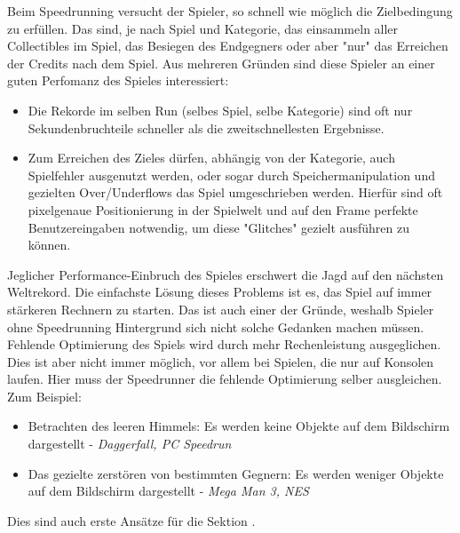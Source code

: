 Beim Speedrunning versucht der Spieler, so schnell wie möglich die Zielbedingung zu erfüllen. Das sind, je nach Spiel und Kategorie, das einsammeln aller Collectibles im Spiel, das Besiegen des Endgegners oder aber "nur" das Erreichen der Credits nach dem Spiel. Aus mehreren Gründen sind diese Spieler an einer guten Perfomanz des Spieles interessiert:

\begin{itemize}
\item Die Rekorde im selben Run (selbes Spiel, selbe Kategorie) sind oft nur Sekundenbruchteile schneller als die zweitschnellesten Ergebnisse.
\item Zum Erreichen des Zieles dürfen, abhängig von der Kategorie, auch Spielfehler ausgenutzt werden, oder sogar durch Speichermanipulation und gezielten Over/Underflows das Spiel umgeschrieben werden. Hierfür sind oft pixelgenaue Positionierung in der Spielwelt und auf den Frame perfekte Benutzereingaben notwendig, um diese "Glitches" gezielt ausführen zu können.
\end{itemize}

Jeglicher Performance-Einbruch des Spieles erschwert die Jagd auf den nächsten Weltrekord. Die einfachste Lösung dieses Problems ist es, das Spiel auf immer stärkeren Rechnern zu starten. Das ist auch einer der Gründe, weshalb Spieler ohne Speedrunning Hintergrund sich nicht solche Gedanken machen müssen. Fehlende Optimierung des Spiels wird durch mehr Rechenleistung ausgeglichen.
Dies ist aber nicht immer möglich, vor allem bei Spielen, die nur auf Konsolen laufen. Hier muss der Speedrunner die fehlende Optimierung selber ausgleichen. Zum Beispiel:
\begin{itemize}
\item Betrachten des leeren Himmels: Es werden keine Objekte auf dem Bildschirm dargestellt - \emph{Daggerfall, PC Speedrun}
\item Das gezielte zerstören von bestimmten Gegnern: Es werden weniger Objekte auf dem Bildschirm dargestellt - \emph{Mega Man 3, NES }
\end{itemize}
Dies sind auch erste Ansätze für die Sektion .

